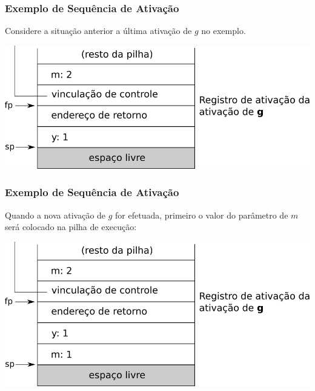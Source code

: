 \documentclass[table]{beamer}
\begin{document}
\begin{frame}
   \frametitle{Exemplo de Sequência de Ativação}
   Considere a situação anterior a última ativação de $g$ no exemplo. \\
   \begin{center}
   \includegraphics[width=\linewidth,height=\textheight,keepaspectratio]{figuras/sequenciaativacao01.png}
   \end{center}
\end{frame}

\begin{frame}
   \frametitle{Exemplo de Sequência de Ativação}
   Quando a nova ativação de $g$ for efetuada, primeiro o valor do parâmetro de $m$ será colocado na pilha de execução: \\
   \begin{center}
   \includegraphics[width=\linewidth,height=\textheight,keepaspectratio]{figuras/sequenciaativacao02.png}
   \end{center}
\end{frame}
\end{document}
